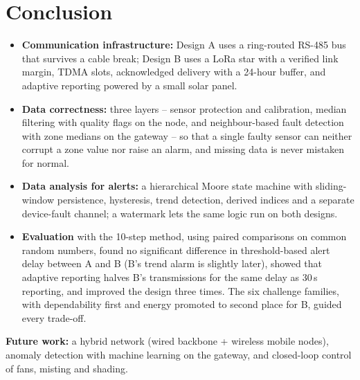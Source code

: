 \documentclass[11pt,a4paper]{report}
\begin{document}
\chapter{Conclusion}\label{ch:concl}
\begin{itemize}
  \item \textbf{Communication infrastructure:} Design A uses a ring-routed RS-485 bus that survives a cable break; Design B uses a LoRa star with a verified link margin, TDMA slots, acknowledged delivery with a 24-hour buffer, and adaptive reporting powered by a small solar panel.
  \item \textbf{Data correctness:} three layers -- sensor protection and calibration, median filtering with quality flags on the node, and neighbour-based fault detection with zone medians on the gateway -- so that a single faulty sensor can neither corrupt a zone value nor raise an alarm, and missing data is never mistaken for normal.
  \item \textbf{Data analysis for alerts:} a hierarchical Moore state machine with sliding-window persistence, hysteresis, trend detection, derived indices and a separate device-fault channel; a watermark lets the same logic run on both designs.
  \item \textbf{Evaluation} with the 10-step method, using paired comparisons on common random numbers, found no significant difference in threshold-based alert delay between A and B (B's trend alarm is slightly later), showed that adaptive reporting halves B's transmissions for the same delay as 30\,s reporting, and improved the design three times. The six challenge families, with dependability first and energy promoted to second place for B, guided every trade-off.
\end{itemize}
\textbf{Future work:} a hybrid network (wired backbone + wireless mobile nodes), anomaly detection with machine learning on the gateway, and closed-loop control of fans, misting and shading.
\end{document}
